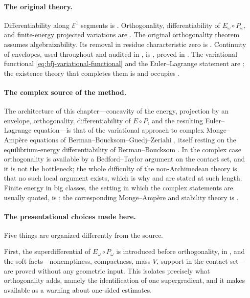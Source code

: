 \enlargethispage{4\baselineskip}

\paragraph{The original theory.}
Differentiability along \(\mathcal E^1\) segments is
\cite[Proposition~6.12]{BFJ15}. Orthogonality, differentiability of
\(E_\omega\circ P_\omega\), and finite-energy projected variations are
\cite[Appendix~A, Theorem~7.2, and Corollary~7.3]{BFJ15}. The original
orthogonality theorem assumes algebraizability. Its removal in residue
characteristic zero is \cite[Theorem~6.3.3]{BGGJKM20}.  Continuity of
envelopes, used throughout and audited in
, is \cite[Theorem~8.3]{BFJ16}, proved in
.  The variational functional
\eqref{eq:bfj-variational-functional} and the Euler--Lagrange statement
 are \cite[\S7]{BFJ15}; the existence theory
that completes them is \cite[\S8]{BFJ15} and occupies
.

\paragraph{The complex source of the method.}
The architecture of this chapter---concavity of the energy, projection by an
envelope, orthogonality, differentiability of \(E\circ P\), and the
resulting Euler--Lagrange equation---is that of the variational approach to
complex Monge--Amp\`ere equations of Berman--Boucksom--Guedj--Zeriahi
\cite{BBGZ13}, itself resting on the equilibrium-energy differentiability of
Berman--Boucksom \cite{BB10}.  In the complex case orthogonality is
available by a Bedford--Taylor argument on the contact set, and it is not
the bottleneck; the whole difficulty of the non-Archimedean theory is that
no such local argument exists, which is why
 and
 are stated at such length.  Finite
energy in big classes, the setting in which the complex statements are
usually quoted, is \cite{BEGZ10}; the corresponding Monge--Amp\`ere and
stability theory is \cite{BBEGZ16}.

\paragraph{The presentational choices made here.}
Five things are organized differently from the source.

First, the superdifferential of \(E_\omega\circ P_\omega\) is introduced
before orthogonality, in , and the soft
facts---nonemptiness, compactness, mass \(V\), support in the contact
set---are proved without any geometric input.  This isolates precisely what
orthogonality adds, namely the identification of one supergradient, and it
makes  available as a warning
about one-sided estimates.

